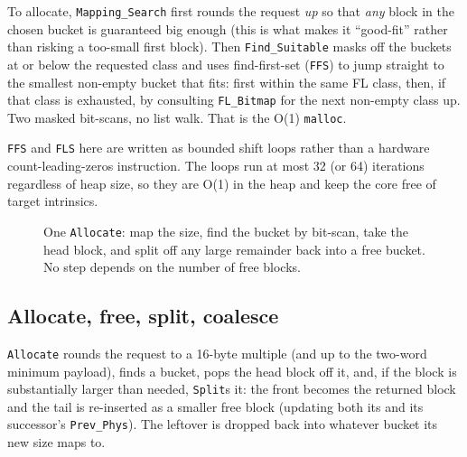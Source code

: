 To allocate, \texttt{Mapping\_Search} first rounds the request \emph{up} so that
\emph{any} block in the chosen bucket is guaranteed big enough (this is what makes
it ``good-fit'' rather than risking a too-small first block). Then
\texttt{Find\_Suitable} masks off the buckets at or below the requested class and
uses find-first-set (\texttt{FFS}) to jump straight to the smallest non-empty
bucket that fits: first within the same FL class, then, if that class is
exhausted, by consulting \texttt{FL\_Bitmap} for the next non-empty class up. Two
masked bit-scans, no list walk. That is the O(1) \texttt{malloc}.

\texttt{FFS} and \texttt{FLS} here are written as bounded shift loops rather than
a hardware count-leading-zeros instruction. The loops run at most 32 (or 64)
iterations regardless of heap size, so they are O(1) in the heap and keep the core
free of target intrinsics.

\begin{figure}[ht]
\centering
{}
\caption{One \texttt{Allocate}: map the size, find the bucket by bit-scan, take
the head block, and split off any large remainder back into a free bucket. No
step depends on the number of free blocks.}
\label{fig:tlsf-alloc}
\end{figure}

\subsection{Allocate, free, split, coalesce}

\texttt{Allocate} rounds the request to a 16-byte multiple (and up to the
two-word minimum payload), finds a bucket, pops the head block off it, and,
if the block is substantially larger than needed, \texttt{Split}s it: the
front becomes the returned block and the tail is re-inserted as a smaller free
block (updating both its and its successor's \texttt{Prev\_Phys}). The leftover
is dropped back into whatever bucket its new size maps to.

